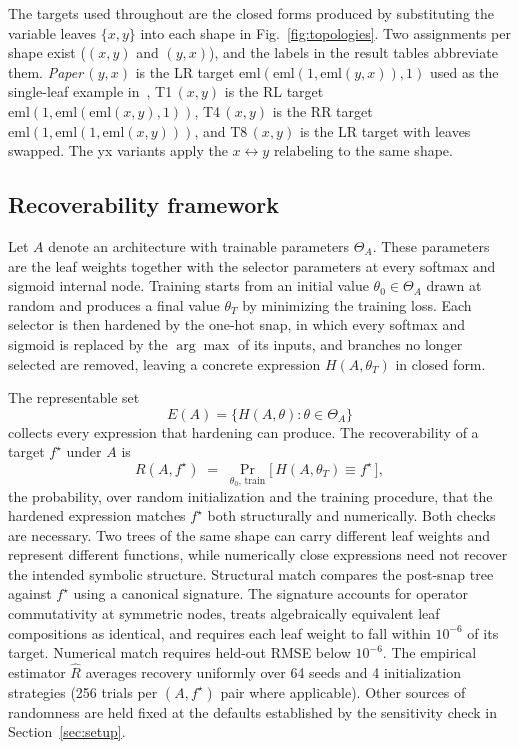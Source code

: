 The targets used throughout are the closed forms produced by
substituting the variable leaves $\{x, y\}$ into each shape in
Fig.~\ref{fig:topologies}.  Two assignments per shape exist
($(x,y)$ and $(y,x)$), and the labels in the result tables abbreviate
them.  \emph{Paper}\,$(y,x)$ is the LR target
$\mathrm{eml}(\mathrm{eml}(1, \mathrm{eml}(y,x)), 1)$ used as the
single-leaf example in~\citep{Odrzywolek2026eml}, T1\,$(x,y)$ is the
RL target $\mathrm{eml}(1, \mathrm{eml}(\mathrm{eml}(x,y), 1))$,
T4\,$(x,y)$ is the RR target
$\mathrm{eml}(1, \mathrm{eml}(1, \mathrm{eml}(x,y)))$, and T8\,$(x,y)$
is the LR target with leaves swapped.  The yx variants apply the
$x \leftrightarrow y$ relabeling to the same shape.

\subsection{Recoverability framework}
\label{sec:framework}

Let $A$ denote an architecture with trainable parameters
$\Theta_A$.  These parameters are the leaf weights together with
the selector parameters at every softmax and sigmoid internal
node.  Training starts from an initial value
$\theta_0 \in \Theta_A$ drawn at random and produces a final
value $\theta_T$ by minimizing the training loss.  Each selector
is then hardened by the one-hot snap, in which every softmax and sigmoid is
replaced by the $\arg\max$ of its inputs, and branches no longer
selected are removed, leaving a concrete expression
$H(A,\theta_T)$ in closed form.

The representable set
\begin{equation}
  E(A) = \{H(A, \theta) : \theta \in \Theta_A\}
\end{equation}
collects every expression that hardening can produce.
The recoverability of a target $f^\star$ under $A$ is
\begin{equation}
  R(A, f^\star) \;=\; \Pr_{\theta_0,\,\text{train}}\bigl[\,H(A,\theta_T) \equiv f^\star\,\bigr],
  \label{eq:recover}
\end{equation}
the probability, over random initialization and the training
procedure, that the hardened expression matches $f^\star$ both
structurally and numerically.  Both
checks are necessary.  Two trees of the same shape can carry
different leaf weights and represent different functions, while
numerically close expressions need not recover the intended
symbolic structure.  Structural match compares the post-snap
tree against $f^\star$ using a canonical signature.  The
signature accounts for operator commutativity at symmetric
nodes, treats algebraically equivalent leaf compositions as
identical, and requires each leaf weight to fall within
$10^{-6}$ of its target.
Numerical match requires held-out RMSE below $10^{-6}$.  The
empirical estimator $\hat R$ averages recovery uniformly over
64 seeds and 4 initialization strategies (256 trials per
$(A, f^\star)$ pair where applicable).  Other sources of
randomness are held fixed at the defaults established by the
sensitivity check in Section~\ref{sec:setup}.

